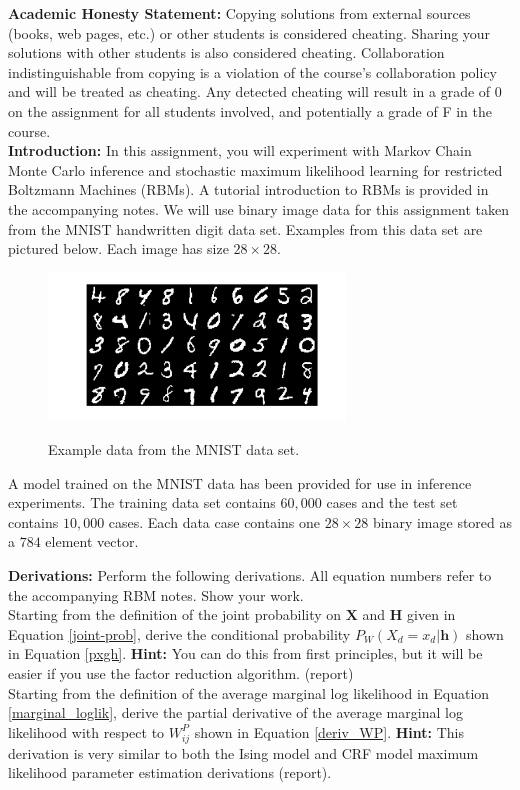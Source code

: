\documentclass[11pt]{article}
\newcommand{\mbf}[1]{{\mathbf{#1}}}
\begin{document}
\textbf{Academic Honesty Statement:} Copying solutions from external
sources (books, web pages, etc.) or other students is considered
cheating. Sharing your solutions with other students is also
considered cheating. Collaboration indistinguishable from copying is a violation 
of the course's collaboration policy and will be treated as cheating.
Any detected cheating will result in a grade of 0
on the assignment for all students involved, and potentially a grade
of F in the course.\\

\textbf{Introduction:} In this assignment, you will experiment with Markov Chain Monte Carlo inference and stochastic maximum likelihood learning for restricted Boltzmann Machines (RBMs). A tutorial
introduction  to RBMs is provided in the accompanying notes.
We will use binary image data for this assignment taken from the MNIST handwritten digit data set. Examples from this data set are pictured below. Each image has size $28\times 28$.\\

\begin{figure}[ht]
\centering
\includegraphics[width=3.1in]{Figures/example_digits.png}
\label{fig_data}
\caption{Example data from the MNIST data set.}
\end{figure}

A model trained on the MNIST data has been provided for use in inference experiments. The training data set contains $60,000$ cases and the test set contains $10,000$ cases. Each data case contains one $28\times 28$ binary image stored as a $784$ element vector.\\


\begin{problem}{20} \textbf{Derivations:} Perform the following derivations. All equation numbers refer to the accompanying RBM notes. Show your work.\\

 Starting from the definition of the joint probability on $\mbf{X}$ and $\mbf{H}$ given in Equation \ref{joint-prob}, derive the conditional probability  $P_W(X_d=x_d|\mbf{h})$ shown in Equation \ref{pxgh}. \textbf{Hint:} You can do this from first principles, but it will be easier if you use the factor reduction algorithm. (report)\\

 Starting from the definition of the average marginal log likelihood in Equation \ref{marginal_loglik}, derive the partial derivative of the average marginal log likelihood with respect to $W^P_{ij}$ shown in Equation \ref{deriv_WP}. \textbf{Hint:} This derivation is very similar to both the Ising model and CRF model maximum likelihood parameter estimation derivations (report).
\end{problem}
\end{document}
